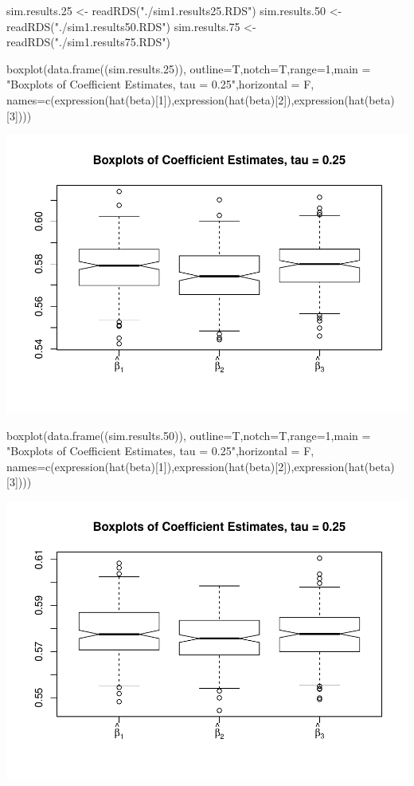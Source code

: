 \begin{Schunk}
\begin{Sinput}
sim.results.25 <- readRDS("./sim1.results25.RDS")
sim.results.50 <- readRDS("./sim1.results50.RDS")
sim.results.75 <- readRDS("./sim1.results75.RDS")
\end{Sinput}
\end{Schunk}

\begin{Schunk}
\begin{Sinput}
boxplot(data.frame((sim.results.25)), outline=T,notch=T,range=1,main = "Boxplots of Coefficient Estimates, tau = 0.25",horizontal = F,
names=c(expression(hat(beta)[1]),expression(hat(beta)[2]),expression(hat(beta)[3])))
\end{Sinput}

\includegraphics{siqr_files/figure-latex/unnamed-chunk-7-1} \end{Schunk}

\begin{Schunk}
\begin{Sinput}
boxplot(data.frame((sim.results.50)), outline=T,notch=T,range=1,main = "Boxplots of Coefficient Estimates, tau = 0.25",horizontal = F,
names=c(expression(hat(beta)[1]),expression(hat(beta)[2]),expression(hat(beta)[3])))
\end{Sinput}

\includegraphics{siqr_files/figure-latex/unnamed-chunk-8-1} \end{Schunk}

